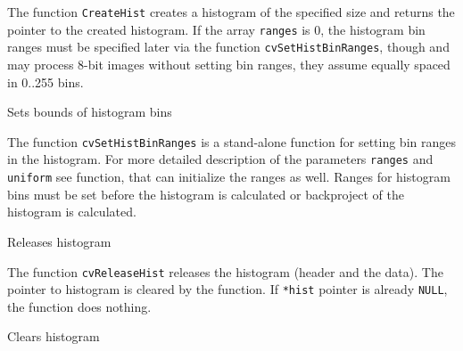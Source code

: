 The function \texttt{CreateHist} creates a histogram of the specified size and returns the pointer to the created histogram. If the array \texttt{ranges} is 0, the histogram bin ranges must be specified later via the function \texttt{cvSetHistBinRanges}, though  and  may process 8-bit images without setting bin ranges, they assume equally spaced in 0..255 bins.

\label{SetHistBinRanges}

Sets bounds of histogram bins


\begin{description}
\end{description}

The function \texttt{cvSetHistBinRanges} is a stand-alone function for setting bin ranges in the histogram. For more detailed description of the parameters \texttt{ranges} and \texttt{uniform} see  function, that can initialize the ranges as well. Ranges for histogram bins must be set before the histogram is calculated or backproject of the histogram is calculated.


\label{ReleaseHist}

Releases histogram


\begin{description}
\end{description}

The function \texttt{cvReleaseHist} releases the histogram (header and the data). The pointer to histogram is cleared by the function. If \texttt{*hist} pointer is already \texttt{NULL}, the function does nothing.

\label{ClearHist}

Clears histogram


\begin{description}
\end{description}

